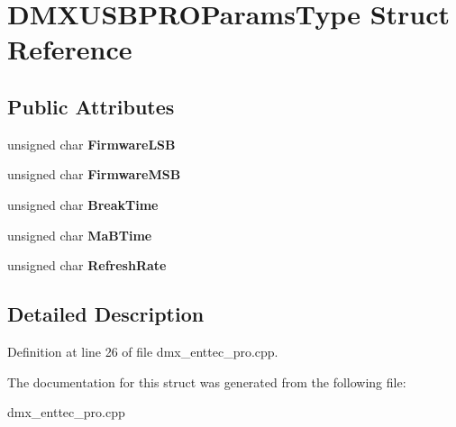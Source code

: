 \hypertarget{structDMXUSBPROParamsType}{\section{D\-M\-X\-U\-S\-B\-P\-R\-O\-Params\-Type Struct Reference}
\label{structDMXUSBPROParamsType}
}
\subsection*{Public Attributes}
\begin{DoxyCompactItemize}
\item 
\hypertarget{structDMXUSBPROParamsType_aafb2113e09068d2c2d90d4254e57e580}{unsigned char {\bfseries Firmware\-L\-S\-B}}\label{structDMXUSBPROParamsType_aafb2113e09068d2c2d90d4254e57e580}

\item 
\hypertarget{structDMXUSBPROParamsType_a545afd72b346f85996c1ae3d0b35a0ef}{unsigned char {\bfseries Firmware\-M\-S\-B}}\label{structDMXUSBPROParamsType_a545afd72b346f85996c1ae3d0b35a0ef}

\item 
\hypertarget{structDMXUSBPROParamsType_a86773af46c2e39c7b260ce1f09ca0a36}{unsigned char {\bfseries Break\-Time}}\label{structDMXUSBPROParamsType_a86773af46c2e39c7b260ce1f09ca0a36}

\item 
\hypertarget{structDMXUSBPROParamsType_a1ab62801637fe44bba062f2bfa54e38e}{unsigned char {\bfseries Ma\-B\-Time}}\label{structDMXUSBPROParamsType_a1ab62801637fe44bba062f2bfa54e38e}

\item 
\hypertarget{structDMXUSBPROParamsType_a6258e9923d9bc0725d4b2cc0be515d70}{unsigned char {\bfseries Refresh\-Rate}}\label{structDMXUSBPROParamsType_a6258e9923d9bc0725d4b2cc0be515d70}

\end{DoxyCompactItemize}


\subsection{Detailed Description}


Definition at line 26 of file dmx\-\_\-enttec\-\_\-pro.\-cpp.



The documentation for this struct was generated from the following file\-:\begin{DoxyCompactItemize}
\item 
dmx\-\_\-enttec\-\_\-pro.\-cpp\end{DoxyCompactItemize}
